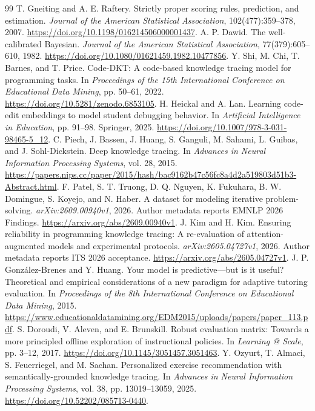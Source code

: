 \documentclass[11pt]{article}
\newcommand{\1}{\mathbb{I}}
\begin{document}
\begin{thebibliography}{99}
 T. Gneiting and A. E. Raftery. Strictly proper scoring rules, prediction, and estimation. \emph{Journal of the American Statistical Association}, 102(477):359--378, 2007. \url{https://doi.org/10.1198/016214506000001437}.
 A. P. Dawid. The well-calibrated Bayesian. \emph{Journal of the American Statistical Association}, 77(379):605--610, 1982. \url{https://doi.org/10.1080/01621459.1982.10477856}.
 Y. Shi, M. Chi, T. Barnes, and T. Price. Code-DKT: A code-based knowledge tracing model for programming tasks. In \emph{Proceedings of the 15th International Conference on Educational Data Mining}, pp. 50--61, 2022. \url{https://doi.org/10.5281/zenodo.6853105}.
 H. Heickal and A. Lan. Learning code-edit embeddings to model student debugging behavior. In \emph{Artificial Intelligence in Education}, pp. 91--98. Springer, 2025. \url{https://doi.org/10.1007/978-3-031-98465-5_12}.
 C. Piech, J. Bassen, J. Huang, S. Ganguli, M. Sahami, L. Guibas, and J. Sohl-Dickstein. Deep knowledge tracing. In \emph{Advances in Neural Information Processing Systems}, vol. 28, 2015. \url{https://papers.nips.cc/paper/2015/hash/bac9162b47c56fc8a4d2a519803d51b3-Abstract.html}.
 F. Patel, S. T. Truong, D. Q. Nguyen, K. Fukuhara, B. W. Domingue, S. Koyejo, and N. Haber. A dataset for modeling iterative problem-solving. \emph{arXiv:2609.00940v1}, 2026. Author metadata reports EMNLP 2026 Findings. \url{https://arxiv.org/abs/2609.00940v1}.
 J. Kim and H. Kim. Ensuring reliability in programming knowledge tracing: A re-evaluation of attention-augmented models and experimental protocols. \emph{arXiv:2605.04727v1}, 2026. Author metadata reports ITS 2026 acceptance. \url{https://arxiv.org/abs/2605.04727v1}.
 J. P. Gonz\'alez-Brenes and Y. Huang. Your model is predictive---but is it useful? Theoretical and empirical considerations of a new paradigm for adaptive tutoring evaluation. In \emph{Proceedings of the 8th International Conference on Educational Data Mining}, 2015. \url{https://www.educationaldatamining.org/EDM2015/uploads/papers/paper_113.pdf}.
 S. Doroudi, V. Aleven, and E. Brunskill. Robust evaluation matrix: Towards a more principled offline exploration of instructional policies. In \emph{Learning @ Scale}, pp. 3--12, 2017. \url{https://doi.org/10.1145/3051457.3051463}.
 Y. Ozyurt, T. Almaci, S. Feuerriegel, and M. Sachan. Personalized exercise recommendation with semantically-grounded knowledge tracing. In \emph{Advances in Neural Information Processing Systems}, vol. 38, pp. 13019--13059, 2025. \url{https://doi.org/10.52202/085713-0440}.

\end{thebibliography}
\end{document}
